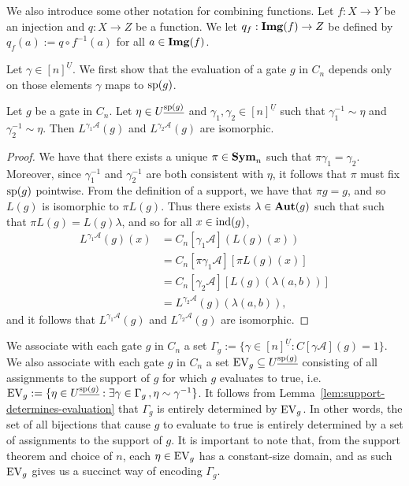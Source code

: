\documentclass[../main/thesis.tex]{subfiles}
\begin{document}
We also introduce some other notation for combining functions. Let $f: X
\rightarrow Y$ be an injection and $q: X \rightarrow Z$ be a function. We let
$q_f : \text{\textbf{Img}}(f) \rightarrow Z$ be defined by $q_f(a) := q \circ f^{-1}(a)$ for
all $a \in \text{\textbf{Img}}(f)$.


Let $\gamma \in [n]^{\underline{U}}$. We first show that the evaluation of a
gate $g$ in $C_n$ depends only on those elements $\gamma$ maps to $\text{sp}(g)$.

\begin{lem}
	Let $g$ be a gate in $C_n$. Let $\eta \in U^{\underline{\text{sp}(g)}}$ and
  $\gamma_1, \gamma_2 \in [n]^{\underline{U}}$ such that $\gamma^{-1}_1 \sim
  \eta$ and $\gamma^{-1}_2 \sim \eta$. Then $L^{\gamma_1 \mathcal{A}}(g)$ and
  $L^{\gamma_2 \mathcal{A}}(g)$ are isomorphic.
	\label{lem:support-determines-evaluation}
\end{lem}

\begin{proof}
	We have that there exists a unique $\pi \in \text{\textbf{Sym}}_n$ such that $\pi \gamma_1 =
  \gamma_2$. Moreover, since $\gamma^{-1}_1$ and $\gamma^{-1}_2$ are both
  consistent with $\eta$, it follows that $\pi$ must fix $\text{sp}(g)$ pointwise.
  From the definition of a support, we have that $\pi g = g$, and so $L(g)$ is
  isomorphic to $\pi L(g)$. Thus there exists $\lambda \in \text{\textbf{Aut}}(g)$ such that
  such that $\pi L(g) = L(g) \lambda$, and so for all $x \in \text{\upshape ind}(g)$,
	\begin{align*}
		L^{\gamma_1 \mathcal{A}}(g) (x) & = C_n[\gamma_1 \mathcal{A}](L(g)(x))                    \\
                                    & = C_n[\pi \gamma_1 \mathcal{A}][\pi L(g)(x)]            \\
                                    & = C_n[\gamma_2 \mathcal{A}][L(g)(\lambda(a,b))] \\
                                    & = L^{\gamma_2 \mathcal{A}}(g) (\lambda (a,b)),                 
	\end{align*}
	and it follows that $L^{\gamma_1 \mathcal{A}}(g)$ and $L^{\gamma_2
    \mathcal{A}}(g)$ are isomorphic.
\end{proof}

We associate with each gate $g$ in $C_n$ a set $\Gamma_g:= \{\gamma \in
[n]^{\underline{U}} : C[\gamma \mathcal{A}](g) = 1 \}$. We also associate with
each gate $g$ in $C_n$ a set $\text{EV}_g \subseteq U^{\underline{\text{sp}(g)}}$
consisting of all assignments to the support of $g$ for which $g$ evaluates to
true, i.e.\ $\text{EV}_g := \{ \eta \in U^{\underline{\text{sp}(g)}} : \exists \gamma \in
\Gamma_g \, ,\eta \sim \gamma^{-1}\}$. It follows from
Lemma~\ref{lem:support-determines-evaluation} that $\Gamma_g$ is entirely
determined by $\text{EV}_g$. In other words, the set of all bijections that cause $g$
to evaluate to true is entirely determined by a set of assignments to the
support of $g$. It is important to note that, from the support theorem and
choice of $n$, each $\eta \in \text{EV}_g$ has a constant-size domain, and as such
$\text{EV}_g$ gives us a succinct way of encoding $\Gamma_g$.
\end{document}
